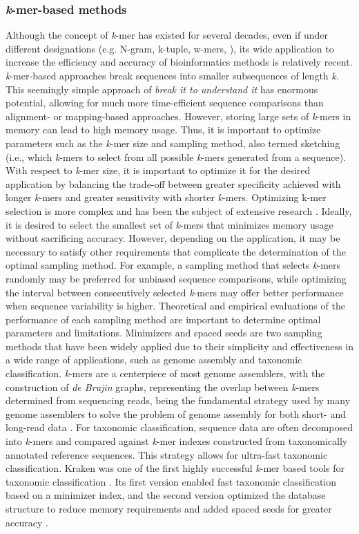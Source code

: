 \subsubsection{\textit{k}-mer-based methods}

Although the concept of \textit{k}-mer has existed for several decades, even if under different designations (e.g. N-gram, k-tuple, w-mers, ), its wide application to increase the efficiency and accuracy of bioinformatics methods is relatively recent. \textit{k}-mer-based approaches break sequences into smaller subsequences of length \textit{k}. This seemingly simple approach of \textit{break it to understand it} has enormous potential, allowing for much more time-efficient sequence comparisons than alignment- or mapping-based approaches. However, storing large sets of \textit{k}-mers in memory can lead to high memory usage. Thus, it is important to optimize parameters such as the \textit{k}-mer size and sampling method, also termed sketching (i.e., which \textit{k}-mers to select from all possible \textit{k}-mers generated from a sequence). With respect to \textit{k}-mer size, it is important to optimize it for the desired application by balancing the trade-off between greater specificity achieved with longer \textit{k}-mers and greater sensitivity with shorter \textit{k}-mers. Optimizing k-mer selection is more complex and has been the subject of extensive research \cite{}. Ideally, it is desired to select the smallest set of \textit{k}-mers that minimizes memory usage without sacrificing accuracy. However, depending on the application, it may be necessary to satisfy other requirements that complicate the determination of the optimal sampling method. For example, a sampling method that selects \textit{k}-mers randomly may be preferred for unbiased sequence comparisons, while optimizing the interval between consecutively selected \textit{k}-mers may offer better performance when sequence variability is higher. Theoretical and empirical evaluations of the performance of each sampling method are important to determine optimal parameters and limitations. Minimizers and spaced seeds are two sampling methods that have been widely applied due to their simplicity and effectiveness in a wide range of applications, such as genome assembly and taxonomic classification. \textit{k}-mers are a centerpiece of most genome assemblers, with the construction of \textit{de Brujin} graphs, representing the overlap between \textit{k}-mers determined from sequencing reads, being the fundamental strategy used by many genome assemblers to solve the problem of genome assembly for both short- and long-read data \cite{medvedev_what_2021}. For taxonomic classification, sequence data are often decomposed into \textit{k}-mers and compared against \textit{k}-mer indexes constructed from taxonomically annotated reference sequences. This strategy allows for ultra-fast taxonomic classification. Kraken was one of the first highly successful \textit{k}-mer based tools for taxonomic classification \cite{wood_kraken_2014}. Its first version enabled fast taxonomic classification based on a minimizer index, and the second version optimized the database structure to reduce memory requirements and added spaced seeds for greater accuracy \cite{wood_improved_2019}.

